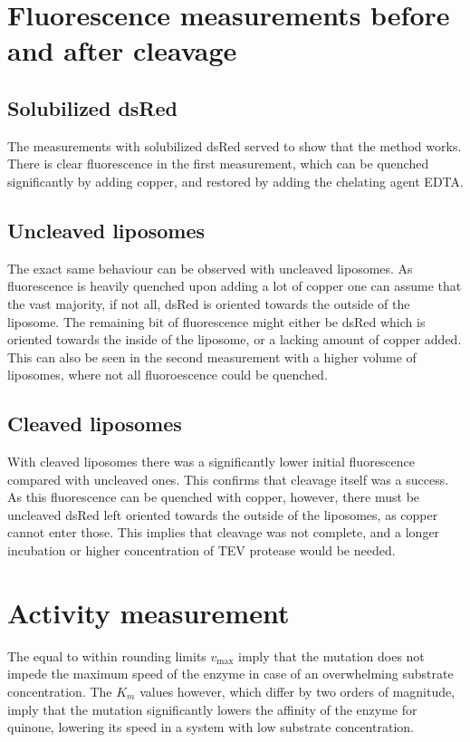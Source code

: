 \section{Fluorescence measurements before and after cleavage}

\subsection{Solubilized dsRed}

The measurements with solubilized dsRed served to show that the method works.
There is clear fluorescence in the first measurement, which can be quenched
significantly by adding copper, and restored by adding the chelating agent
EDTA.

\subsection{Uncleaved liposomes}

The exact same behaviour can be observed with uncleaved liposomes. As
fluorescence is heavily quenched upon adding a lot of copper one can assume
that the vast majority, if not all, dsRed is oriented towards the outside of
the liposome. The remaining bit of fluorescence might either be dsRed which is
oriented towards the inside of the liposome, or a lacking amount of copper
added. This can also be seen in the second measurement with a higher volume of
liposomes, where not all fluoroescence could be quenched.

\subsection{Cleaved liposomes}

With cleaved liposomes there was a significantly lower initial fluorescence
compared with uncleaved ones. This confirms that cleavage itself was a success.
As this fluorescence can be quenched with copper, however, there must be
uncleaved dsRed left oriented towards the outside of the liposomes, as copper
cannot enter those. This implies that cleavage was not complete, and a longer
incubation or higher concentration of TEV protease would be needed.

\section{Activity measurement}

The equal to within rounding limits $v_{\text{max}}$ imply that the mutation
does not impede the maximum speed of the enzyme in case of an overwhelming
substrate concentration. The $K_m$ values however, which differ by two orders
of magnitude, imply that the mutation significantly lowers the affinity of the
enzyme for quinone, lowering its speed in a system with low substrate
concentration.
